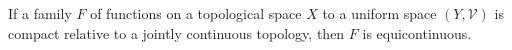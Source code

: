 If a family $F$ of functions on a topological space $X$ to a uniform space $(Y, \mathcal{V})$ is compact relative to a jointly continuous topology, then $F$ is equicontinuous.
